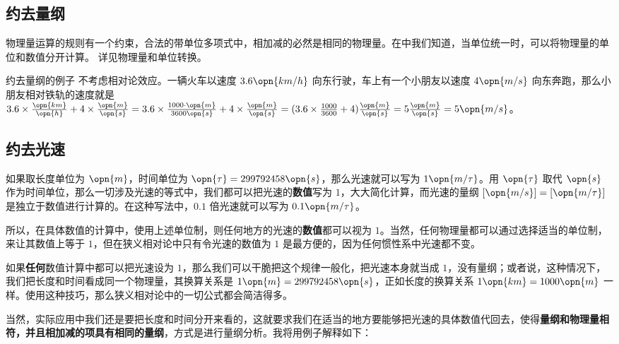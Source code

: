 

\subsection{约去量纲}

物理量运算的规则有一个约束，合法的带单位多项式中，相加减的必然是相同的物理量。在中我们知道，当单位统一时，可以将物理量的单位和数值分开计算。 详见物理量和单位转换。

\begin{example}{约去量纲的例子}
不考虑相对论效应。一辆火车以速度 $3.6\opn{km/h}$ 向东行驶，车上有一个小朋友以速度 $4\opn{m/s}$ 向东奔跑，那么小朋友相对铁轨的速度就是 $3.6\times\frac{\opn{km}}{\opn{h}}+4\times\frac{\opn{m}}{\opn{s}}=3.6\times\frac{1000\cdot \opn{m}}{3600\opn{s}}+4\times\frac{\opn{m}}{\opn{s}}=(3.6\times\frac{1000}{3600}+4)\frac{\opn{m}}{\opn{s}}=5\frac{\opn{m}}{\opn{s}}=5\opn{m/s}$。
\end{example}

\subsection{约去光速}

如果取长度单位为 $\opn{m}$，时间单位为 $\opn{\tau}=299792458\opn{s}$，那么光速就可以写为 $1\opn{m/\tau}$。用 $\opn{\tau}$ 取代 $\opn{s}$ 作为时间单位，那么一切涉及光速的等式中，我们都可以把光速的\textbf{数值}写为 $1$，大大简化计算，而光速的量纲 $[\opn{m/s}]=[\opn{m/\tau}]$ 是独立于数值进行计算的。在这种写法中，$0.1$ 倍光速就可以写为 $0.1\opn{m/\tau}$。

所以，在具体数值的计算中，使用上述单位制，则任何地方的光速的\textbf{数值}都可以视为 $1$。当然，任何物理量都可以通过选择适当的单位制，来让其数值上等于 $1$，但在狭义相对论中只有令光速的数值为 $1$ 是最方便的，因为任何惯性系中光速都不变。

如果\textbf{任何}数值计算中都可以把光速设为 $1$，那么我们可以干脆把这个规律一般化，把光速本身就当成 $1$，没有量纲；或者说，这种情况下，我们把长度和时间看成同一个物理量，其换算关系是 $1\opn{m}=299792458\opn{s}$，正如长度的换算关系 $1\opn{km}=1000\opn{m}$ 一样。使用这种技巧，那么狭义相对论中的一切公式都会简洁得多。

当然，实际应用中我们还是要把长度和时间分开来看的，这就要求我们在适当的地方要能够把光速的具体数值代回去，使得\textbf{量纲和物理量相符，并且相加减的项具有相同的量纲}，方式是进行量纲分析。我将用例子解释如下：

